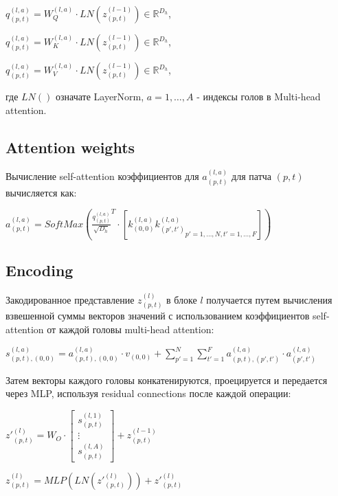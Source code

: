 \documentclass[PMI,KR]{HSEUniversity}
\begin{document}
\begin{center}
$q_{(p, t)}^{(l, a)} = W_{Q}^{(l, a)} \cdot LN(z_{(p, t)}^{(l-1)}) \in \mathds{R}^{D_{h}}$,

$q_{(p, t)}^{(l, a)} = W_{K}^{(l, a)} \cdot LN(z_{(p, t)}^{(l-1)}) \in \mathds{R}^{D_{h}}$,

$q_{(p, t)}^{(l, a)} = W_{V}^{(l, a)} \cdot LN(z_{(p, t)}^{(l-1)}) \in \mathds{R}^{D_{h}}$,   
\end{center}
где $LN()$ означате LayerNorm, $a = 1, \dots, A$ - индексы голов в Multi-head attention.

\subsection{Attention weights}
Вычисление self-attention коэффициентов для $a_{(p, t)}^{(l, a)}$ для патча $(p, t)$ вычисляется как:

\begin{center}
$a_{(p, t)}^{(l, a)} = SoftMax(\frac{q_{(p, t)}^{(l, a)}}{\sqrt{D_{h}}}^{T} \cdot \left[k_{(0, 0)}^{(l, a)} {k_{(p', t')}^{(l, a)}}_{p' = 1, \dots, N, t' = 1, \dots, F} \right])$
\end{center}

\subsection{Encoding}

Закодированное представление $z_{(p, t)}^{(l)}$ в блоке $l$ получается путем вычисления взвешенной суммы векторов значений с использованием коэффициентов self-attention от каждой головы multi-head attention:

\begin{center}
$s_{(p, t),(0, 0)}^{(l, a)} = a_{(p, t),(0, 0)}^{(l, a)} \cdot v_{(0, 0)} + \sum\limits_{p'=1}^N \sum\limits_{t'=1}^F a_{(p, t),(p', t')}^{(l, a)} \cdot a_{(p', t')}^{(l, a)}$
\end{center}

Затем векторы каждого головы конкатенируются, проецируется и передается через MLP, используя residual connections после каждой операции:

\begin{center}
$z'_{(p, t)}^{(l)} = W_{O} \cdot \begin{bmatrix} 
  s_{(p, t)}^{(l, 1)} \\
  \vdots  \\
  s_{(p, t)}^{(l, A)}
\end{bmatrix} + z_{(p, t)}^{(l - 1)}$

$z_{(p, t)}^{(l)} = MLP(LN(z'_{(p, t)}^{(l)})) + z'_{(p, t)}^{(l)}$
\end{center}
\end{document}
